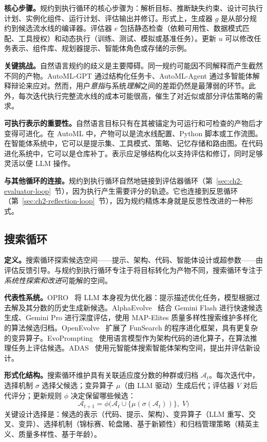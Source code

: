 \textbf{核心步骤。}规约到执行循环的核心步骤为：解析目标、推断缺失约束、设计可执行计划、实例化组件、运行计划、评估输出并修订。形式上，生成器 $g$ 是从部分规约到候选流水线的编译器。评估器 $e$ 包括静态检查（依赖可用性、数据模式匹配、工具授权）和动态执行（训练、测试、模拟或基准任务）。更新 $u$ 可以修改任务表示、组件库、规划器提示、智能体角色或存储的示例。

\textbf{关键挑战。}自然语言规约的歧义是主要障碍。同一规约可能因不同解释而产生截然不同的产物。AutoML-GPT 通过结构化任务卡、AutoML-Agent 通过多智能体解释辩论来应对。然而，用户\emph{意指}与系统\emph{理解}之间的差距仍然是最薄弱的环节。此外，每次迭代执行完整流水线的成本可能很高，催生了对近似或部分评估策略的需求。

\textbf{可执行表示的重要性。}自然语言目标只有在其被锚定为可运行和可检查的产物后才变得可进化。在 AutoML 中，产物可以是流水线配置、Python 脚本或工作流图。在智能体系统中，它可以是提示集、工具模式、策略、记忆存储和路由图。在代码进化系统中，它可以是仓库补丁。表示应足够结构化以支持评估和修订，同时足够灵活以便 LLM 操作。

\textbf{与其他循环的连接。}规约到执行循环自然地链接到评估器循环（第~\ref{sec:ch2-evaluator-loop}~节），因为执行产生需要评分的轨迹。它也连接到反思循环（第~\ref{sec:ch2-reflection-loop}~节），因为规约精炼本身就是反思性改进的一种形式。

\subsection{搜索循环}\label{sec:ch2-search-loop}

\textbf{定义。}搜索循环探索候选空间——提示、架构、代码、智能体设计或超参数——由评估反馈引导。与规约到执行循环专注于将目标转化为产物不同，搜索循环专注于\emph{系统性探索和改进}可能解的空间。

\textbf{代表性系统。}OPRO~\cite{opro2023} 将 LLM 本身视为优化器：提示描述优化任务，模型根据过去解及其分数的历史生成新候选。AlphaEvolve~\cite{alphaevolve2025} 结合 Gemini Flash 进行快速候选生成、Gemini Pro 进行深度评估，使用 MAP-Elites 质量多样性搜索维护多样化的算法候选归档。OpenEvolve~\cite{openevolve2024} 扩展了 FunSearch 的程序进化框架，具有更复杂的变异算子。EvoPrompting~\cite{evoprompting2023} 使用语言模型作为架构代码的进化算子，在算法推理任务上评估候选。ADAS~\cite{adas2025} 使用元智能体搜索智能体架构空间，提出并评估新设计。

\textbf{形式化结构。}搜索循环维护具有关联适应度分数的种群或归档 $\mathcal{A}_t$。每次迭代中，选择机制 $\sigma$ 选择父候选；变异算子 $\mu$（由 LLM 驱动）生成后代；评估器 $V$ 对后代评分；更新规则 $\phi$ 决定保留哪些候选：
\begin{equation}\label{eq:ch2-search-loop}
\mathcal{A}_{t+1} = \phi\big(\mathcal{A}_t \cup \{\mu(\sigma(\mathcal{A}_t))\},\; V\big)
\end{equation}
关键设计选择是：候选的表示（代码、提示、架构）、变异算子（LLM 重写、交叉、变异）、选择机制（锦标赛、轮盘赌、基于新颖性）和归档管理策略（精英主义、质量多样性、基于年龄）。

